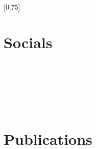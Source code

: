 \documentclass[jdlanctot]{mycv}
\begin{document}
\setlength{\columnsep}{1.0cm}
[0.75]
\begin{paracol}{2}

\paracolbackgroundoptions

\footnotesize
{\setasidefontcolour
\flushleft

\begin{minipage}[t]{0.22\textwidth}
\section*{Socials}
\href{\myEmailHref}{%
}\\[0.5em]
\href{\myTwitterHref}{%
}\\[0.5em]
\href{\myLinkedInHref}{%
}\\[0.5em]
\href{\myGitHubHref}{%
}
\end{minipage}\\[1.0em]

\begin{minipage}[t]{0.22\textwidth}
\section*{Publications}
\href{\myGoogleScholarHref}{%
}\\[0.5em]
\href{\myOrchidHref}{%
}
\end{minipage}\\[-1.0em]

}
\end{paracol}
\end{document}
